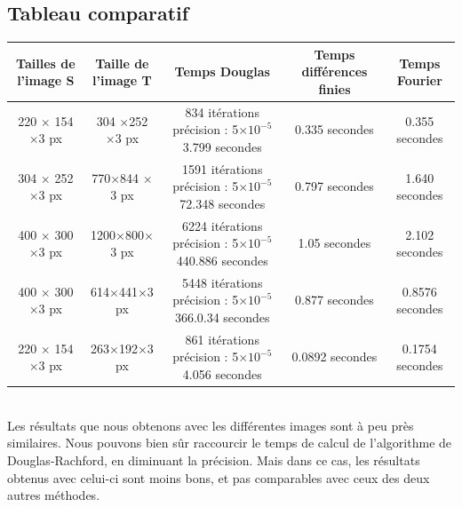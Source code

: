 \subsection{Tableau comparatif}
\begin{tabular}{|c|c|c|c|c|}
\hline
Tailles de l'image S & Taille de l'image T& Temps Douglas & Temps différences finies & Temps Fourier\\
\hline
220 $\times$ 154 $\times$3 px & 304 $\times $252 $\times $3 px &  \shortstack{ 834 itérations\\ précision : 5$\times 10^{-5}$\\3.799 secondes} & 0.335 secondes & 0.355 secondes \\

\hline
304 $\times$ 252 $\times$3 px & 770$\times$844 $\times $3 px & \shortstack{ 1591 itérations\\ précision : 5$\times 10^{-5}$\\72.348 secondes} & 0.797 secondes & 1.640 secondes \\
\hline
400 $\times$ 300 $\times$3 px & 1200$\times$800$\times $3 px & \shortstack{ 6224 itérations\\ précision : 5$\times 10^{-5}$\\440.886 secondes} & 1.05 secondes & 2.102 secondes \\
\hline
400 $\times$ 300 $\times$3 px & 614$\times$441$\times $3 px & \shortstack{ 5448 itérations\\ précision : 5$\times 10^{-5}$\\366.0.34 secondes} & 0.877 secondes & 0.8576 secondes \\
\hline
220 $\times$ 154 $\times$3 px & 263$\times$192$\times $3 px & \shortstack{ 861 itérations\\ précision : 5$\times 10^{-5}$\\4.056 secondes} & 0.0892 secondes & 0.1754 secondes \\
\hline

\end{tabular}\\
Les résultats que nous obtenons avec les différentes images sont à peu près similaires. Nous pouvons bien sûr raccourcir le temps de calcul de l'algorithme de Douglas-Rachford, en diminuant la précision. Mais dans ce cas, les résultats obtenus avec celui-ci sont moins bons, et pas comparables avec ceux des deux autres méthodes. 

